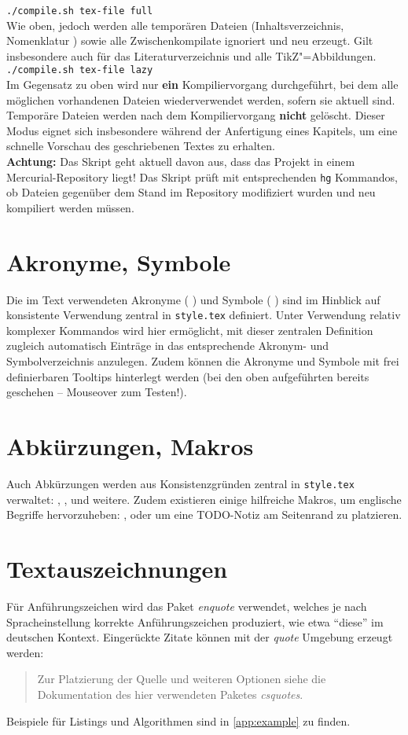 %
\texttt{./compile.sh tex-file full}\\Wie oben, jedoch werden alle temporären Dateien (Inhaltsverzeichnis, Nomenklatur \etc{}) sowie alle Zwischenkompilate ignoriert und neu erzeugt. Gilt insbesondere auch für das Literaturverzeichnis und alle TikZ"=Abbildungen.\\[1em]
%
\texttt{./compile.sh tex-file lazy}\\Im Gegensatz zu oben wird nur \textbf{ein} Kompiliervorgang durchgeführt, bei dem alle möglichen vorhandenen Dateien wiederverwendet werden, sofern sie aktuell sind. Temporäre Dateien werden nach dem Kompiliervorgang \textbf{nicht} gelöscht. Dieser Modus eignet sich insbesondere während der Anfertigung eines Kapitels, um eine schnelle Vorschau des geschriebenen Textes zu erhalten.\\[1em]
%
\textbf{Achtung:} Das Skript geht aktuell davon aus, dass das Projekt in einem Mercurial-Repository liegt! Das Skript prüft mit entsprechenden \texttt{hg} Kommandos, ob Dateien gegenüber dem Stand im Repository modifiziert wurden und neu kompiliert werden müssen.
%
%
\section{Akronyme, Symbole}\label{sec:symbole}
%
Die im Text verwendeten Akronyme (\zB{} \SCADA{}) und Symbole (\zB{} \sstoerung{}) sind im Hinblick auf konsistente Verwendung zentral in \texttt{style.tex} definiert. Unter Verwendung relativ komplexer Kommandos wird hier ermöglicht, mit dieser zentralen Definition zugleich automatisch Einträge in das entsprechende Akronym- und Symbolverzeichnis anzulegen. Zudem können die Akronyme und Symbole mit frei definierbaren Tooltips hinterlegt werden (bei den oben aufgeführten bereits geschehen -- Mouseover zum Testen!).
%
%
\section{Abkürzungen, Makros}\label{sec:makros}
%
Auch Abkürzungen werden aus Konsistenzgründen zentral in \texttt{style.tex} verwaltet: \zB{}, \sog{}, \bzgl{} und weitere. Zudem existieren einige hilfreiche Makros, \bspw{} um englische Begriffe hervorzuheben: , oder um eine TODO-Notiz am Seitenrand zu platzieren.
%
%
\section{Textauszeichnungen}\label{sec:textauszeichnungen}
%
Für Anführungszeichen wird das Paket \emph{enquote} verwendet, welches je nach Spracheinstellung korrekte Anführungszeichen produziert, wie etwa \enquote{diese} im deutschen Kontext. Eingerückte Zitate können mit der \emph{quote} Umgebung erzeugt werden:
%
\begin{quote}
  Zur Platzierung der Quelle und weiteren Optionen siehe die Dokumentation des hier verwendeten Paketes \emph{csquotes}.
\end{quote}
%
Beispiele für Listings und Algorithmen sind in \autoref{app:example} zu finden.
%
%
